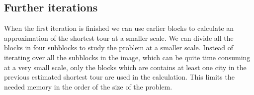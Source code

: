 \subsection{Further iterations}


When the first iteration is finished we can use earlier blocks to calculate an approximation of the shortest tour at a smaller scale. We can divide all the blocks in four subblocks to study the problem at a smaller scale. Instead of iterating over all the subblocks in the image, which can be quite time consuming at a very small scale, only the blocks which are contains at least one city in the previous estimated shortest tour are used in the calculation. This limits the needed memory in the order of the size of the problem.


